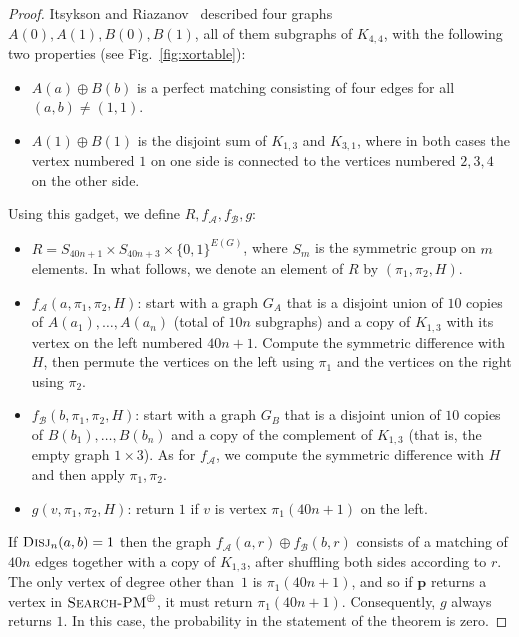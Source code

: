\documentclass[11pt]{article}
\newcommand{\scterm}[1]{{\textrm{\sc #1}}}
\newcommand{\disj}{\scterm{Disj}}
\newcommand{\xorPM}{\textsc{Search-PM}^\oplus}
\newcommand{\Alice}{\mathcal{A}}
\newcommand{\Bob}{\mathcal{B}}
\numberwithin{equation}{section}
\begin{document}
\begin{proof}
Itsykson and Riazanov~\cite{IR21} described four graphs $A(0),A(1),B(0),B(1)$, all of them subgraphs of $K_{4,4}$, with the following two properties (see Fig.~\ref{fig:xortable}): 
\begin{itemize}
\item $A(a) \oplus B(b)$ is a perfect matching consisting of four edges for all $(a,b) \neq (1,1)$.
\item $A(1) \oplus B(1)$ is the disjoint sum of $K_{1,3}$ and $K_{3,1}$, where in both cases the vertex numbered $1$ on one side is connected to the vertices numbered $2,3,4$ on the other side.
\end{itemize}

Using this gadget, we define $R,f_{\Alice},f_{\Bob},g$:
\begin{itemize}
\item $R = S_{40n+1} \times S_{40n+3} \times \{0,1\}^{E(G)}$, where $S_m$ is the symmetric group on $m$ elements. In what follows, we denote an element of $R$ by $(\pi_1,\pi_2,H)$.

\item $f_{\Alice}(a,\pi_1,\pi_2,H)$: start with a graph $G_A$ that is a disjoint union of $10$ copies of $A(a_1),\dotsc,A(a_n)$ (total of $10n$ subgraphs) and a copy of $K_{1,3}$ with its vertex on the left numbered $40n+1$. 
Compute the symmetric difference with $H$, then
permute the vertices on the left using $\pi_1$ and the vertices on the right using $\pi_2$.

\item $f_{\Bob}(b,\pi_1,\pi_2,H)$: start with a graph $G_B$ that is a disjoint union of $10$ copies of  $B(b_1),\dotsc,B(b_n)$ and a copy of the complement of $K_{1,3}$ (that is, the empty graph $1\times 3$).
As for $f_{\Alice}$, we compute the symmetric difference with $H$ and then apply $\pi_1,\pi_2$.

\item $g(v,\pi_1,\pi_2,H)$: return $1$ if $v$ is vertex $\pi_1(40n+1)$ on the left. %

\end{itemize}

If $\disj_n(a,b) = 1$ then the graph $f_{\Alice}(a,r) \oplus f_{\Bob}(b,r)$ consists of a matching of $40n$ edges together with a copy of $K_{1,3}$, after shuffling both sides according to $r$. The only vertex of degree other than~$1$ is $\pi_1(40n+1)$, and so if $\mathbf{p}$ returns a vertex in $\xorPM$, it must return $\pi_1(40n+1)$. Consequently, $g$ always returns $1$. In this case, the probability in the statement of the theorem is zero.


\end{proof}
\end{document}
